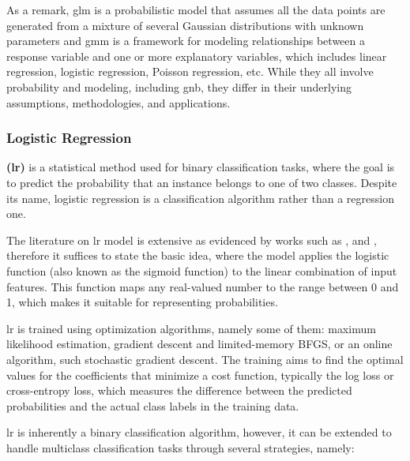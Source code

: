 As a remark, \gls{glm} is a probabilistic model that assumes all the data points are generated from a mixture of several Gaussian distributions with unknown parameters and \gls{gmm} is a framework for modeling relationships between a response variable and one or more explanatory variables, which includes linear regression, logistic regression, Poisson regression, etc. While they all involve probability and modeling, including \gls{gnb}, they differ in their underlying assumptions, methodologies, and applications.


\subsubsection{Logistic Regression}
\label{subsubsec:machine_learning_logistic_regrassion}

\textbf{ (\gls{lr})} is a statistical method used for binary classification tasks, where the goal is to predict the probability that an instance belongs to one of two classes. Despite its name, logistic regression is a classification algorithm rather than a regression one.

The literature on \gls{lr} model is extensive as evidenced by works such as \cite{Mitchell1997}, \cite{Bouguila2020} and \cite{Russel2010}, therefore it suffices to state the basic idea, where the model applies the logistic function (also known as the sigmoid function) to the linear combination of input features. This function maps any real-valued number to the range between 0 and 1, which makes it suitable for representing probabilities.

\gls{lr} is trained using optimization algorithms, namely some of them: maximum likelihood estimation, gradient descent and limited-memory BFGS, or an online algorithm, such stochastic gradient descent. The training aims to find the optimal values for the coefficients that minimize a cost function, typically the log loss or cross-entropy loss, which measures the difference between the predicted probabilities and the actual class labels in the training data.

\gls{lr} is inherently a binary classification algorithm, however, it can be extended to handle multiclass classification tasks through several strategies, namely:

